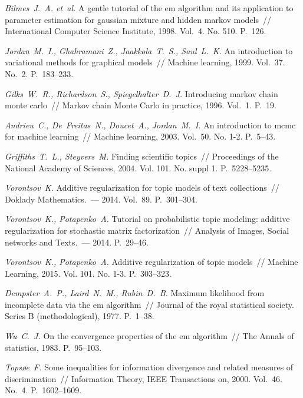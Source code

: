 \documentclass[12pt, twoside]{article}
\begin{document}
\begin{thebibliography}{10}
\emph{Bilmes~J.~A. et~al.}
A gentle tutorial of the em algorithm and its application to parameter
  estimation for gaussian mixture and hidden markov models~//
International Computer Science Institute,
1998.
Vol.~4.
No. 510.
P.~126.

\emph{Jordan~M.~I., Ghahramani~Z., Jaakkola~T.~S., Saul~L.~K.}
An introduction to variational methods for graphical models~//
Machine learning,
1999.
Vol.~37.
No.~2.
P.~183--233.

\emph{Gilks~W.~R., Richardson~S., Spiegelhalter~D.~J.}
Introducing markov chain monte carlo~//
Markov chain Monte Carlo in practice,
1996.
Vol.~1.
P.~19.

\emph{Andrieu~C., De~Freitas~N., Doucet~A., Jordan~M.~I.}
An introduction to mcmc for machine learning~//
Machine learning,
2003.
Vol.~50.
No. 1-2.
P.~5--43.

\emph{Griffiths~T.~L., Steyvers~M.}
Finding scientific topics~//
Proceedings of the National Academy of Sciences,
2004.
Vol. 101.
No. suppl 1.
P.~5228--5235.

\emph{Vorontsov~K.}
Additive regularization for topic models of text collections~//
Doklady Mathematics.~---
2014.
Vol.~89.
P.~301--304.

\emph{Vorontsov~K., Potapenko~A.}
Tutorial on probabilistic topic modeling: additive regularization for
  stochastic matrix factorization~//
Analysis of Images, Social networks and Texts.~---
2014.
P.~29--46.

\emph{Vorontsov~K., Potapenko~A.}
Additive regularization of topic models~//
Machine Learning,
2015.
Vol. 101.
No. 1-3.
P.~303--323.

\emph{Dempster~A.~P., Laird~N.~M., Rubin~D.~B.}
Maximum likelihood from incomplete data via the em algorithm~//
Journal of the royal statistical society. Series B (methodological),
1977.
P.~1--38.

\emph{Wu~C.~J.}
On the convergence properties of the em algorithm~//
The Annals of statistics,
1983.
P.~95--103.

\emph{Tops{\o}e~F.}
Some inequalities for information divergence and related measures of
  discrimination~//
Information Theory, IEEE Transactions on,
2000.
Vol.~46.
No.~4.
P.~1602--1609.

\end{thebibliography}
\end{document}
